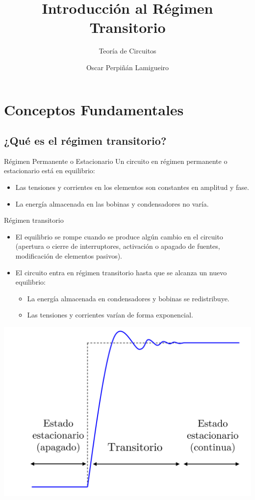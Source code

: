\documentclass[aspectratio=169, usenames,svgnames,dvipsnames]{beamer}
\author{Oscar Perpiñán Lamigueiro}
\date{}
\title{Introducción al Régimen Transitorio}
\subtitle{Teoría de Circuitos}
\begin{document}
\maketitle
\section{Conceptos Fundamentales}
\label{sec:org7a48a79}

\subsection{¿Qué es el régimen transitorio?}
\label{sec:orga27f895}
\begin{frame}[label={sec:org4c4778d}]{Régimen Permanente o Estacionario}
Un circuito en régimen permanente o estacionario está en equilibrio:
\begin{itemize}
\item Las tensiones y corrientes en los elementos son constantes en amplitud y fase.
\item La energía almacenada en las bobinas y condensadores no varía.
\end{itemize}
\end{frame}
\begin{frame}[label={sec:org452a5b8}]{Régimen transitorio}
\begin{itemize}
\item El equilibrio se rompe cuando se produce algún cambio en el circuito (apertura o cierre de interruptores, activación o apagado de fuentes, modificación de elementos pasivos).
\item El circuito entra en régimen transitorio hasta que se alcanza un nuevo equilibrio:
\begin{itemize}
\item La energía almacenada en condensadores y bobinas se redistribuye.
\item Las tensiones y corrientes varían de forma exponencial.
\end{itemize}
\end{itemize}

\begin{center}
\includegraphics[height=0.55\textheight]{../figs/ej_transitorio_DC.png}
\end{center}
\end{frame}
\end{document}
